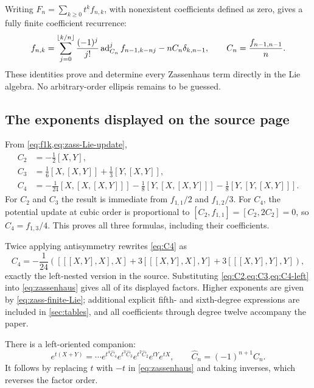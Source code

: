Writing $F_n=\sum_{k\geq0}t^k f_{n,k}$, with nonexistent coefficients defined as zero, gives a fully finite coefficient recurrence:
\begin{equation}\label{eq:zass-finite-Lie}
 f_{n,k}=\sum_{j=0}^{\lfloor k/n\rfloor}\frac{(-1)^j}{j!}
       \operatorname{ad}_{C_n}^j f_{n-1,k-nj}
       -nC_n\delta_{k,n-1},\qquad
 C_n=\frac{f_{n-1,n-1}}{n}.
\end{equation}
These identities prove and determine every Zassenhaus term directly in the Lie algebra. No arbitrary-order ellipsis remains to be guessed.

\subsection{The exponents displayed on the source page}
From \cref{eq:f1k,eq:zass-Lie-update},
\begin{align}
 C_2&=-\tfrac12[X,Y],\label{eq:C2}\\
 C_3&=\tfrac16[X,[X,Y]]+\tfrac13[Y,[X,Y]],\label{eq:C3}\\
 C_4&=-\tfrac1{24}[X,[X,[X,Y]]]
       -\tfrac18[Y,[X,[X,Y]]]
       -\tfrac18[Y,[Y,[X,Y]]].\label{eq:C4}
\end{align}
For $C_2$ and $C_3$ the result is immediate from $f_{1,1}/2$ and $f_{1,2}/3$. For $C_4$, the potential update at cubic order is proportional to $[C_2,f_{1,1}]=[C_2,2C_2]=0$, so $C_4=f_{1,3}/4$. This proves all three formulas, including their coefficients.

Twice applying antisymmetry rewrites \cref{eq:C4} as
\begin{equation}\label{eq:C4-left}
 C_4=-\frac1{24}\left(
 [[[X,Y],X],X]+3[[[X,Y],X],Y]+3[[[X,Y],Y],Y]\right),
\end{equation}
exactly the left-nested version in the source. Substituting \cref{eq:C2,eq:C3,eq:C4-left} into \cref{eq:zassenhaus} gives all of its displayed factors. Higher exponents are given by \cref{eq:zass-finite-Lie}; additional explicit fifth- and sixth-degree expressions are included in \cref{sec:tables}, and all coefficients through degree twelve accompany the paper.

There is a left-oriented companion:
\begin{equation}\label{eq:zass-left}
 e^{t(X+Y)}=\cdots e^{t^4\widehat C_4}e^{t^3\widehat C_3}
 e^{t^2\widehat C_2}e^{tY}e^{tX},
 \qquad \widehat C_n=(-1)^{n+1}C_n.
\end{equation}
It follows by replacing $t$ with $-t$ in \cref{eq:zassenhaus} and taking inverses, which reverses the factor order.

